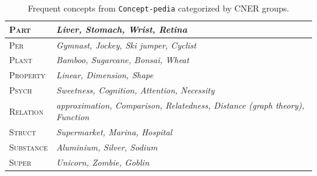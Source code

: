 \documentclass[11pt]{article}
\newcommand{\resource}{Concept-pedia}
\begin{document}
\begin{table}[h]
{\begin{tabular}{l|l}
    \hline
    \textsc{Part} & \textit{Liver, Stomach, Wrist, Retina} \\
    \hline
    \textsc{Per} & \textit{Gymnast, Jockey, Ski jumper, Cyclist} \\
    \hline
    \textsc{Plant} & \textit{Bamboo, Sugarcane, Bonsai, Wheat} \\
    \hline
    \textsc{Property} & \textit{Linear, Dimension, Shape} \\
    \hline
    \textsc{Psych} & \textit{Sweetness, Cognition, Attention, Necessity} \\
    \hline
    \textsc{Relation} & \textit{approximation, Comparison, Relatedness, Distance (graph theory), Function} \\
    \hline
    \textsc{Struct} & \textit{Supermarket, Marina, Hospital} \\
    \hline
    \textsc{Substance} & \textit{Aluminium, Silver, Sodium} \\
    \hline
    \textsc{Super} & \textit{Unicorn, Zombie, Goblin} \\
    \bottomrule
\end{tabular}%
}
\caption{Frequent concepts from \texttt{\resource} categorized by CNER groups.}
\label{tab:cner-examples}
\end{table}


\end{document}
